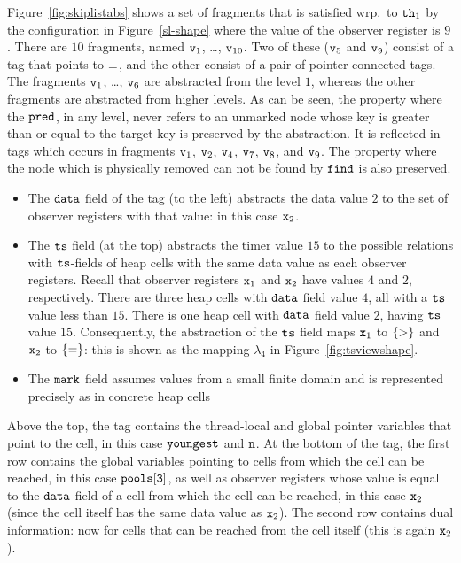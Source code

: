 Figure~\ref{fig:skiplistabs} shows a set of fragments that is
satisfied wrp.\ to ${\tt th}_1$ by the configuration in Figure~\ref{sl-shape} where the value of the observer register is $9$.
There are $10$ fragments, named $\mathtt{v}_1$, \ldots , $\mathtt{v}_{10}$. Two of
these ($\mathtt{v}_5$ and $\mathtt{v}_9$) consist of a tag that points to $\bot$,
and the other consist of a pair of pointer-connected tags. The fragments $\mathtt{v}_1$, \ldots , $\mathtt{v}_{6}$ are abstracted from the level $1$, whereas the other fragments are abstracted from higher levels. As can be seen, the property where the $\tt pred$, in any level, never refers to an unmarked node whose key is greater than or equal to the target key is preserved by the abstraction. It is reflected in tags which occurs in fragments $\mathtt{v}_1$, $\mathtt{v}_2$, $\mathtt{v}_4$, $\mathtt{v}_7$, $\mathtt{v}_8$, and $\mathtt{v}_9$. The property where the node which is physically removed can not be found by $\tt find$ is also preserved.   
\begin{itemize}
\item The $\tt data$ field of the tag (to the left) abstracts the data value
  $2$ to the set of observer registers with that value: in this case
  $\mathtt{x}_2$.
\item The $\tt ts$ field (at the top) abstracts the timer value $15$ to
  the possible relations with $\tt ts$-fields of heap cells with the same
  data value as each observer registers. Recall that observer registers
  $\mathtt{x}_1$ and $\mathtt{x}_2$ have values $4$ and $2$, respectively. There are
  three heap cells with $\tt data$ field value $4$, all with a $\tt ts$
  value less than $15$. There is one heap cell with
  $\tt data$ field value $2$, having $\tt ts$ value $15$.
  Consequently, the abstraction of the $\tt ts$ field maps $\mathtt{x}_1$ to
  $\left\{>\right\}$ and $\mathtt{x}_2$ to $\left\{=\right\}$: this is shown as the mapping
  $\lambda_4$ in Figure~\ref{fig:tsviewshape}.
\item The $\tt mark$ field assumes values from a small finite domain and
  is represented precisely as in concrete heap cells
\end{itemize}
Above the top, the tag contains the thread-local and global pointer variables
that point to the cell, in this case $\tt youngest$ and $\tt n$.
At the bottom of the tag, the first row contains the global variables 
pointing to cells from which the cell can be reached, in this case
$\tt pools[3]$, as well as observer registers whose value is equal to the
${\tt data}$ field of a cell from which  the cell can be reached, in this
case $\mathtt{x}_2$ (since the cell itself has the same data value as $\mathtt{x}_2$).
The second row contains dual information: now for cells that can be reached
from the cell itself (this is again $\mathtt{x}_2$).

